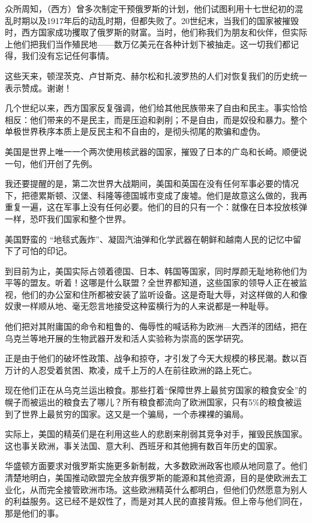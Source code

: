 \documentclass[UTF8, 11pt, oneside]{ctexart}
\begin{document}
众所周知，（西方）曾多次制定干预俄罗斯的计划，他们试图利用十七世纪初的混乱时期以及1917年后的动乱时期，但都失败了。20世纪末，当我们的国家被摧毁时，西方国家成功攫取了俄罗斯的财富。当时，他们称我们为朋友和伙伴，但实际上他们把我们当作殖民地——数万亿美元在各种计划下被抽走。这一切我们都记得，我们没有忘记任何事情。

这些天来，顿涅茨克、卢甘斯克、赫尔松和扎波罗热的人们对恢复我们的历史统一表示赞成。谢谢！

几个世纪以来，西方国家反复强调，他们给其他民族带来了自由和民主。事实恰恰相反：他们带来的不是民主，而是压迫和剥削；不是自由，而是奴役和暴力。整个单极世界秩序本质上是反民主和不自由的，是彻头彻尾的欺骗和虚伪。

美国是世界上唯一一个两次使用核武器的国家，摧毁了日本的广岛和长崎。顺便说一句，他们开创了先例。

我还要提醒的是，第二次世界大战期间，美国和英国在没有任何军事必要的情况下，把德累斯顿、汉堡、科隆等德国城市变成了废墟。他们是故意这么做的，我再重复一遍，这在军事上没有任何必要。他们的目的只有一个：就像在日本投放核弹一样，恐吓我们国家和整个世界。

美国野蛮的 “地毯式轰炸”、凝固汽油弹和化学武器在朝鲜和越南人民的记忆中留下了可怕的印记。

到目前为止，美国实际占领着德国、日本、韩国等国家，同时厚颜无耻地称他们为平等的盟友。听着！这哪是什么联盟？全世界都知道，这些国家的领导人正在被监视，他们的办公室和住所都被安装了监听设备。这是奇耻大辱，对这样做的人和像奴隶一样顺从地、毫无怨言地接受这种蛮横行为的人来说都是一种耻辱。

他们把对其附庸国的命令和粗鲁的、侮辱性的喊话称为欧洲—大西洋的团结，把在乌克兰等地开展的生物武器开发和活人实验称为崇高的医学研究。

正是由于他们的破坏性政策、战争和掠夺，才引发了今天大规模的移民潮。数以百万计的人忍受着贫困、欺凌，成千上万的人在前往欧洲的路上死亡。

现在他们正在从乌克兰运出粮食。那些打着“保障世界上最贫穷国家的粮食安全”的幌子而被运出的粮食去了哪儿？所有粮食都流向了欧洲国家，只有5\%的粮食被运到了世界上最贫穷的国家。这又是一个骗局，一个赤裸裸的骗局。

实际上，美国的精英们是在利用这些人的悲剧来削弱其竞争对手，摧毁民族国家。这也事关欧洲，事关法国、意大利、西班牙和其他拥有数百年历史的国家。

华盛顿方面要求对俄罗斯实施更多新制裁，大多数欧洲政客也顺从地同意了。他们清楚地明白，美国推动欧盟完全放弃俄罗斯的能源和其他资源，目的是使欧洲去工业化，从而完全接管欧洲市场。这些欧洲精英什么都明白，但他们仍然愿意为别人的利益服务。这已经不是奴性了，而是对其人民的直接背叛。但上帝与他们同在，那是他们的事。
\end{document}
